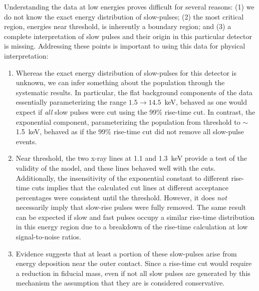 	Understanding the data at low energies proves difficult for several reasons: (1) we do not know the exact energy distribution of slow-pulses; (2) the most critical region, energies near threshold, is inherently a boundary region; and (3) a complete interpretation of slow pulses and their origin in this particular detector is missing.  Addressing these points is important to using this data for physical interpretation:
	
	\begin{enumerate}
		\item Whereas the exact energy distribution of slow-pulses for this detector is unknown, we can infer something about the population through the systematic results.  In particular, the flat background components of the data essentially parameterizing the range $1.5\to14.5$~keV, behaved as one would expect if \emph{all} slow pulses were cut using the 99\% rise-time cut.  In contrast, the exponential component, parameterizing the population from threshold to $\sim$1.5~keV, behaved as if the 99\% rise-time cut did not remove all slow-pulse events.  
		\item Near threshold, the two x-ray lines at 1.1 and 1.3~keV provide a test of the validity of the model, and these lines behaved well with the cuts.  Additionally, the insensitivity of the exponential constant to different rise-time cuts implies that the calculated cut lines at different acceptance percentages were consistent until the threshold.  However, it does \emph{not} necessarily imply that slow-rise pulses were fully removed.  The same result can be expected if slow and fast pulses occupy a similar rise-time distribution in this energy region due to a breakdown of the rise-time calculation at low signal-to-noise ratios.
		\item Evidence suggests that at least a portion of these slow-pulses arise from energy deposition near the outer contact.  Since a rise-time cut would require a reduction in fiducial mass, even if not all slow pulses are generated by this mechanism the assumption that they are is considered conservative.  
	\end{enumerate}
	
